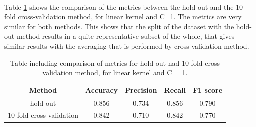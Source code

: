 \documentclass{article}
\begin{document}
\\
Table \ref{table:rta_SVM_cross} shows the comparison of the metrics between the hold-out and the 10-fold cross-validation method, for linear kernel and C=1. The metrics are very similar for both methods. This shows that the split of the dataset with the hold-out method results in a quite representative subset of the whole, that gives similar results with the averaging that is performed by cross-validation method.
\begin{table}[h!]
\centering
\begin{tabular}{||c c c c c||} 
 \hline
Method &  Accuracy & Precision & Recall & F1 score \\ [0.5ex] 
 \hline\hline
hold-out & 0.856 & 0.734 & 0.856 & 0.790  \\  
 10-fold cross validation &  0.842&  0.710 & 0.842& 0.770 \\ [1ex] 
 \hline
\end{tabular}
\caption{Table including comparison of metrics for hold-out nad 10-fold cross validation method, for linear kernel and C = 1.}
\label{table:rta_SVM_cross}
\end{table}
\end{document}

